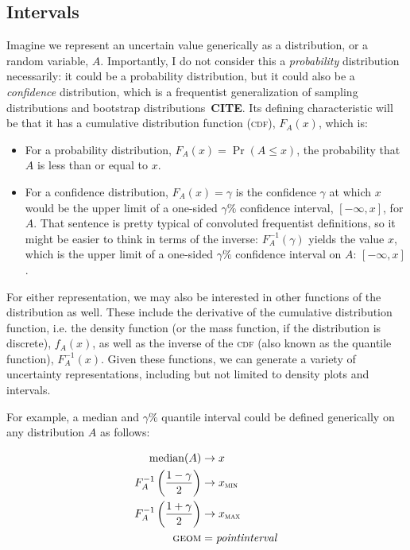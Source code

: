\documentclass[journal]{vgtc}                     %
\begin{document}
\subsection{Intervals}

Imagine we represent an uncertain value generically as a distribution, or a random variable, $A$. Importantly, I do not consider this a \textit{probability} distribution necessarily: it could be a probability distribution, but it could also be a \textit{confidence} distribution, which is a frequentist generalization of sampling distributions and bootstrap distributions~\textbf{CITE}. Its defining characteristic will be that it has a cumulative distribution function (\textsc{cdf}), $F_A(x)$, which is:
\begin{itemize}
    \item For a probability distribution, $F_A(x) = \Pr(A \le x)$, the probability that $A$ is less than or equal to $x$.
    \item   For a confidence distribution, $F_A(x) = \gamma$  is the confidence $\gamma$ at which $x$ would be the upper limit of a one-sided $\gamma\%$ confidence interval, $[-\infty, x]$, for $A$. That sentence is pretty typical of convoluted frequentist definitions, so it might be easier to think in terms of the inverse: $F_A^{-1}(\gamma)$ yields the value $x$, which is the upper limit of a one-sided $\gamma\%$ confidence interval on $A$: $[-\infty,x]$.
\end{itemize}

For either representation, we may also be interested in other functions of the distribution as well. These include the derivative of the cumulative distribution function, i.e. the density function (or the mass function, if the distribution is discrete), $f_A(x)$, as well as the inverse of the \textsc{cdf} (also known as the quantile function), $F_A^{-1}(x)$. Given these functions, we can generate a variety of uncertainty representations, including but not limited to density plots and intervals.

For example, a median and $\gamma\%$ quantile interval could be defined generically on any distribution $A$ as follows:

\begin{align*}
\operatorname{median}(A) &\rightarrow x\\
F_A^{-1}\left(\frac{1 - \gamma}{2}\right) &\rightarrow x_\textsc{min}\\
F_A^{-1}\left(\frac{1 + \gamma}{2}\right) &\rightarrow x_\textsc{max}\\
\textsc{geom} &= \mathit{pointinterval}
\end{align*}
\end{document}
